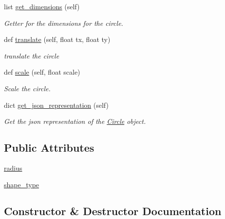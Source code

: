 \begin{DoxyCompactItemize}
$$list \mbox{\hyperlink{classbridges_1_1circle_1_1_circle_acb282c1119ad5da1eb6f02f4c36eb714}{get\+\_\+dimensions}} (self)
\begin{DoxyCompactList}\small\item\em Getter for the dimensions for the circle. \end{DoxyCompactList}\item 
def \mbox{\hyperlink{classbridges_1_1circle_1_1_circle_abe8b18df0025d5d9cca88baf05dfc9ad}{translate}} (self, float tx, float ty)
\begin{DoxyCompactList}\small\item\em translate the circle \end{DoxyCompactList}\item 
def \mbox{\hyperlink{classbridges_1_1circle_1_1_circle_a92c1f6b354aed8cb29a52c92ffb3bbbc}{scale}} (self, float scale)
\begin{DoxyCompactList}\small\item\em Scale the circle. \end{DoxyCompactList}\item 
dict \mbox{\hyperlink{classbridges_1_1circle_1_1_circle_ad694ef551d1d26078bddbecaed711ca1}{get\+\_\+json\+\_\+representation}} (self)
\begin{DoxyCompactList}\small\item\em Get the json representation of the \mbox{\hyperlink{classbridges_1_1circle_1_1_circle}{Circle}} object. \end{DoxyCompactList}\end{DoxyCompactItemize}
\subsection*{Public Attributes}
\begin{DoxyCompactItemize}
\item 
\mbox{\hyperlink{classbridges_1_1circle_1_1_circle_ab52ae32c28ea4175b815a7b04491205b}{radius}}
\item 
\mbox{\hyperlink{classbridges_1_1circle_1_1_circle_a34d318970485d12445ce43225b81428e}{shape\+\_\+type}}
\end{DoxyCompactItemize}


\subsection{Constructor \& Destructor Documentation}
\mbox{\label{classbridges_1_1circle_1_1_circle_a60369252614097265daa56881e961f9f}} 
